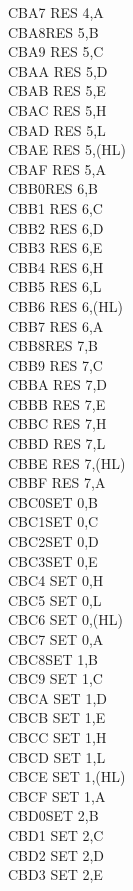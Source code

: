 \documentclass[twoside,openright,a4paper]{book}
\begin{document}
\begin{multicols}{3}
{\begin{tabbing}
	CBA7\> 	RES 4,A\\
	CBA8\>RES 5,B\\
	CBA9\> 	RES 5,C\\
	CBAA\> 	RES 5,D\\
	CBAB\> 	RES 5,E\\
	CBAC\> 	RES 5,H\\
	CBAD\> 	RES 5,L\\
	CBAE\> 	RES 5,(HL)\\
	CBAF\> 	RES 5,A\\
	CBB0\>RES 6,B\\
	CBB1\> 	RES 6,C\\
	CBB2\> 	RES 6,D\\
	CBB3\> 	RES 6,E\\
	CBB4\> 	RES 6,H\\
	CBB5\> 	RES 6,L\\
	CBB6\> 	RES 6,(HL)\\
	CBB7\> 	RES 6,A\\
	CBB8\>RES 7,B\\
	CBB9\> 	RES 7,C\\
	CBBA\> 	RES 7,D\\
	CBBB\> 	RES 7,E\\
	CBBC\> 	RES 7,H\\
	CBBD\> 	RES 7,L\\
	CBBE\> 	RES 7,(HL)\\
	CBBF\> 	RES 7,A\\
	CBC0\>SET 0,B\\
	CBC1\>SET 0,C\\
	CBC2\>SET 0,D\\
	CBC3\>SET 0,E\\
	CBC4\> 	SET 0,H\\
	CBC5\> 	SET 0,L\\
	CBC6\> 	SET 0,(HL)\\
	CBC7\> 	SET 0,A\\
	CBC8\>SET 1,B\\
	CBC9\> 	SET 1,C\\
	CBCA\> 	SET 1,D\\
	CBCB\> 	SET 1,E\\
	CBCC\> 	SET 1,H\\
	CBCD\> 	SET 1,L\\
	CBCE\> 	SET 1,(HL)\\
	CBCF\> 	SET 1,A\\
	CBD0\>SET 2,B\\
	CBD1\> 	SET 2,C\\
	CBD2\> 	SET 2,D\\
	CBD3\> 	SET 2,E\\

\end{tabbing}}
\end{multicols}
\end{document}
